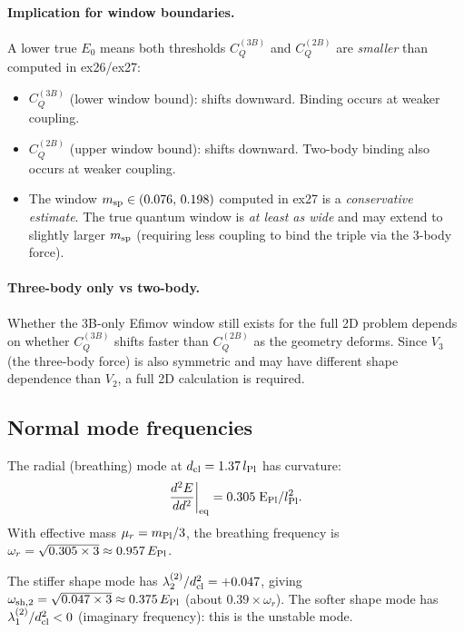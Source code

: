 \paragraph{Implication for window boundaries.}
A lower true $E_0$ means both thresholds $C_Q^{(3B)}$ and $C_Q^{(2B)}$
are \emph{smaller} than computed in ex26/ex27:
\begin{itemize}
\item $C_Q^{(3B)}$ (lower window bound): shifts downward.
  Binding occurs at weaker coupling.
\item $C_Q^{(2B)}$ (upper window bound): shifts downward.
  Two-body binding also occurs at weaker coupling.
\item The window $m_{\rm sp}\in(0.076,\,0.198)$ computed in ex27 is a
  \emph{conservative estimate}.  The true quantum window is
  \emph{at least as wide} and may extend to slightly larger $m_{\rm sp}$
  (requiring less coupling to bind the triple via the 3-body force).
\end{itemize}

\paragraph{Three-body only vs two-body.}
Whether the 3B-only Efimov window still exists for the full 2D problem
depends on whether $C_Q^{(3B)}$ shifts faster than $C_Q^{(2B)}$ as
the geometry deforms.  Since $V_3$ (the three-body force) is also
symmetric and may have different shape dependence than $V_2$, a full
2D calculation is required.

\subsection{Normal mode frequencies}

The radial (breathing) mode at $d_{\rm cl}=1.37\,l_{\rm Pl}$ has curvature:
\begin{equation}
  \frac{d^2E}{dd^2}\bigg|_{\rm eq} = 0.305\;\text{E}_{\rm Pl}/l_{\rm Pl}^2.
\end{equation}
With effective mass $\mu_r = m_{\rm Pl}/3$, the breathing frequency is
$\omega_r = \sqrt{0.305\times3}\approx0.957\,E_{\rm Pl}$.

The stiffer shape mode has $\lambda_2^{(2)}/d_{\rm cl}^2=+0.047$,
giving $\omega_{\rm sh,2}=\sqrt{0.047\times3}\approx0.375\,E_{\rm Pl}$
(about $0.39\times\omega_r$).
The softer shape mode has $\lambda_1^{(2)}/d_{\rm cl}^2<0$ (imaginary
frequency): this is the unstable mode.

